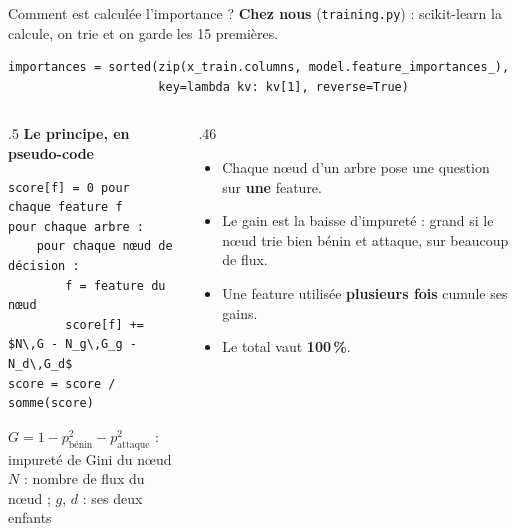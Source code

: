 \documentclass[aspectratio=169,11pt,xcolor=table]{beamer}
\newcommand{\espacement}{\setlength{\itemsep}{.7em}}
\begin{document}
\begin{frame}[fragile]{Comment est calculée l'importance ?}
  \textbf{Chez nous} (\texttt{training.py}) : scikit-learn la calcule, on trie et on garde les 15 premières.
\begin{lstlisting}
importances = sorted(zip(x_train.columns, model.feature_importances_),
                     key=lambda kv: kv[1], reverse=True)
\end{lstlisting}
  \vspace{.3em}

  \begin{columns}[T]
    \begin{column}{.5\linewidth}
      \textbf{Le principe, en pseudo-code}
\begin{lstlisting}[language={},mathescape=true,basicstyle=\ttfamily\small]
score[f] = 0 pour chaque feature f
pour chaque arbre :
    pour chaque nœud de décision :
        f = feature du nœud
        score[f] += $N\,G - N_g\,G_g - N_d\,G_d$
score = score / somme(score)
\end{lstlisting}
      \vspace{.2em}
      \small
      $G = 1 - p_{\text{bénin}}^2 - p_{\text{attaque}}^2$ : impureté de Gini du nœud\\
      $N$ : nombre de flux du nœud ; $g$, $d$ : ses deux enfants
    \end{column}
    \begin{column}{.46\linewidth}
      \begin{itemize}\espacement
        \item Chaque nœud d'un arbre pose une question sur \textbf{une} feature.
        \item Le gain est la baisse d'impureté : grand si le nœud trie bien bénin et attaque, sur beaucoup de flux.
        \item Une feature utilisée \textbf{plusieurs fois} cumule ses gains.
        \item Le total vaut \textbf{100\,\%}.
      \end{itemize}
    \end{column}
  \end{columns}
\end{frame}
\end{document}
